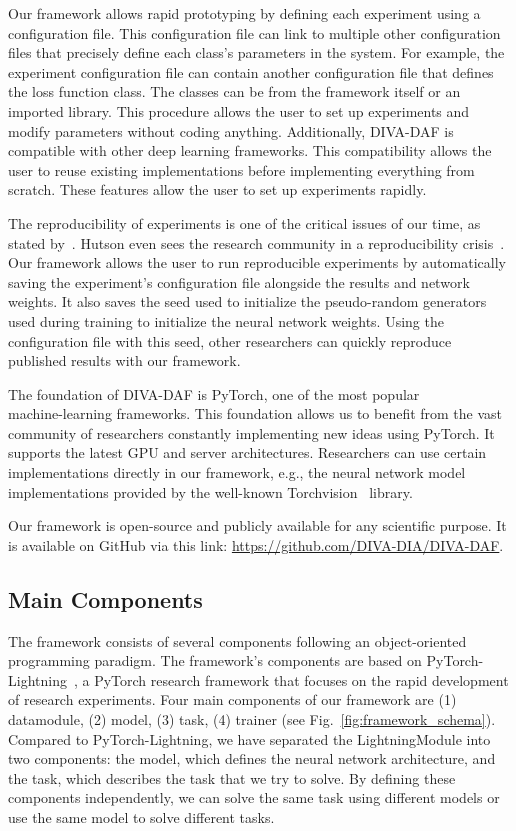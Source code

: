 \documentclass[runningheads]{llncs}
\begin{document}
Our framework allows rapid prototyping by defining each experiment using a configuration file. This configuration file can link to multiple other configuration files that precisely define each class's parameters in the system. For example, the experiment configuration file can contain another configuration file that defines the loss function class. The classes can be from the framework itself or an imported library. This procedure allows the user to set up experiments and modify parameters without coding anything. Additionally, DIVA-DAF is compatible with other deep learning frameworks. This compatibility allows the user to reuse existing implementations before implementing everything from scratch. These features allow the user to set up experiments rapidly.

The reproducibility of experiments is one of the critical issues of our time, as stated by~\cite{olorisadeReproducibilityMachineLearningBased2017}. Hutson even sees the research community in a reproducibility crisis~\cite{hutsonArtificialIntelligenceFaces2018}. Our framework allows the user to run reproducible experiments by automatically saving the experiment's configuration file alongside the results and network weights. It also saves the seed used to initialize the pseudo-random generators used during training to initialize the neural network weights. Using the configuration file with this seed, other researchers can quickly reproduce published results with our framework.

The foundation of DIVA-DAF is PyTorch, one of the most popular \\machine-learning frameworks. This foundation allows us to benefit from the vast community of researchers constantly implementing new ideas using PyTorch. It supports the latest GPU and server architectures. Researchers can use certain implementations directly in our framework, e.g., the neural network model implementations provided by the well-known Torchvision~\cite{paszkePyTorchImperativeStyle2019} library.

Our framework is open-source and publicly available for any scientific purpose. It is available on GitHub via this link: \url{https://github.com/DIVA-DIA/DIVA-DAF}. 


\subsection{Main Components}\label{subsec:components}
The framework consists of several components following an object-oriented programming paradigm. The framework's components are based on PyTorch-\\Lightning~\cite{falconPyTorchLightning2019}, a PyTorch research framework that focuses on the rapid development of research experiments. Four main components of our framework are (1) datamodule, (2) model, (3) task, (4) trainer (see Fig.~\ref{fig:framework_schema}). Compared to PyTorch-Lightning, we have separated the LightningModule into two components: the model, which defines the neural network architecture, and the task, which describes the task that we try to solve. By defining these components independently, we can solve the same task using different models or use the same model to solve different tasks.
\end{document}
